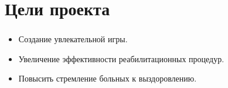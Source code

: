 \section{Цели проекта}

\begin{frame}
\frametitle{\insertsection} 
\framesubtitle{\insertsubsection}
    \begin{itemize}
        \item Создание увлекательной игры.
        \item Увеличение эффективности реабилитационных процедур.
        \item Повысить стремление больных к выздоровлению.
    \end{itemize}
\end{frame}